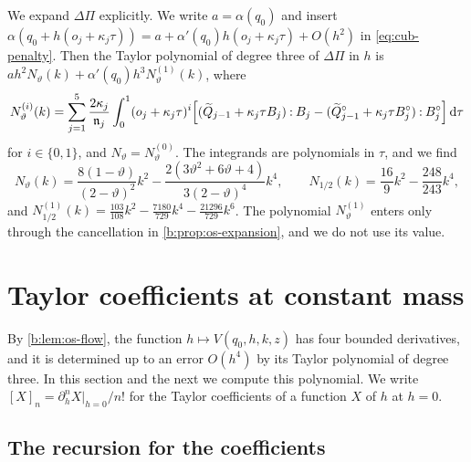 We expand $\Delta\Pi$ explicitly. We write $a=\alpha(q_0)$ and insert
$\alpha(q_0+h(o_j+\kappa_j\tau))=a+\alpha'(q_0)h(o_j+\kappa_j\tau)+O(h^2)$ in
\eqref{eq:cub-penalty}. Then the Taylor polynomial of degree three of
$\Delta\Pi$ in $h$ is
$ah^2N_\vartheta(k)+\alpha'(q_0)h^3N_\vartheta^{(1)}(k)$, where
\begin{equation}\label{eq:cub-N}
 N^{(i)}_\vartheta(k)=\sum_{j=1}^5\frac{2\kappa_j}{\mathfrak n_j}\int_0^1
 (o_j+\kappa_j\tau)^i\Bigl[(\widetilde Q_{j-1}+\kappa_j\tau B_j)\mathbin:B_j
 -(\widetilde Q^\circ_{j-1}+\kappa_j\tau B_j^\circ)\mathbin:B^\circ_j\Bigr]\,\mathrm d\tau
\end{equation}
for $i\in\{0,1\}$, and $N_\vartheta=N_\vartheta^{(0)}$. The integrands are
polynomials in $\tau$, and we find
\begin{equation}\label{eq:cub-N-explicit}
 N_\vartheta(k)=\frac{8(1-\vartheta)}{(2-\vartheta)^2}k^2
 -\frac{2(3\vartheta^2+6\vartheta+4)}{3(2-\vartheta)^4}k^4,\qquad
 N_{1/2}(k)=\frac{16}9k^2-\frac{248}{243}k^4,
\end{equation}
and $N^{(1)}_{1/2}(k)=\frac{103}{108}k^2-\frac{7180}{729}k^4-\frac{21296}{729}k^6$.
The polynomial $N^{(1)}_\vartheta$ enters only through the cancellation in
\cref{b:prop:os-expansion}, and we do not use its value.

\section{Taylor coefficients at constant mass}\label{sec:cub-coefficients}

By \cref{b:lem:os-flow}, the function $h\mapsto V(q_0,h,k,z)$ has four
bounded derivatives, and it is determined up to an error $O(h^4)$ by its
Taylor polynomial of degree three. In this section and the next we compute
this polynomial. We write $[X]_n=\partial_h^nX|_{h=0}/n!$ for the Taylor
coefficients of a function $X$ of $h$ at $h=0$.

\subsection{The recursion for the coefficients}

